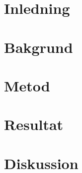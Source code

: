\documentclass[11pt, titlepage, oneside, a4paper]{article}
\begin{document}

	\section{Inledning}
	

	\newpage

	\section{Bakgrund}
	

	\newpage

	\section{Metod}
	

	\newpage

	\section{Resultat}
	

	\newpage

	\section{Diskussion}
	
	
	
% 		
% 
\end{document}
